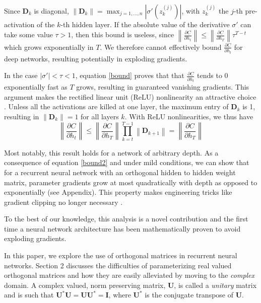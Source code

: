 \documentclass{article} %
\newcommand{\matr}[1]{\mathbf{#1}}
\newcommand\norm[1]{\left\lVert#1\right\rVert}
\begin{document}
Since $\matr{D}_k$ is diagonal, $\norm{\matr{D}_k} = \max_{j=1, ..., n} |\sigma'(z_k^{(j)})|$,
with $z_k^{(j)}$ the $j$-th pre-activation of the $k$-th hidden layer.
If the absolute value of the derivative $\sigma'$ can take some value $\tau > 1$, then 
this bound is useless, since $\norm{\frac{\partial C}{\partial h_t}} 
\leq \norm{\frac{\partial C}{\partial h_T}} \tau^{T-t}$ which grows exponentially 
in $T$. We therefore cannot effectively bound $\frac{\partial C}{\partial h_t}$ 
for deep networks, resulting potentially in exploding gradients.

In the case $|\sigma'| < \tau < 1$, equation \ref{bound} proves that 
that $\frac{\partial C}{\partial h_t}$ tends to 0 exponentially fast as $T$ grows, 
resulting in guaranteed vanishing gradients. 
This argument makes the rectified linear unit (ReLU) nonlinearity an attractive choice
\citep{Glorot2011, Nair2010}. Unless all the activations are killed at one layer, 
the maximum entry of $\matr{D}_k$ is 1, resulting in
$\norm{\matr{D}_k} = 1$ for all layers $k$. With ReLU nonlinearities, we thus have
\begin{equation}
  \norm{\frac{\partial C}{\partial h_t}} \leq \norm{ \frac{\partial C}{\partial h_T}} 
  \prod_{k=t}^{T-1} \norm{\matr{D}_{k+1}} = \norm{\frac{\partial C}{\partial h_T}}
\label{bound2}
\end{equation}

Most notably, this result holds for a network of arbitrary depth. 
As a consequence of equation \ref{bound2} and under mild conditions, we can show that
for a recurrent neural network with an orthogonal hidden to hidden weight matrix, 
parameter gradients grow at most quadratically with depth as opposed to exponentially
{\color{red}(see Appendix)}. This property makes engineering tricks like gradient clipping no longer
necessary \citep{Pascanu2013}.

To the best of our knowledge, this analysis is a novel contribution and the first time a 
neural network architecture has been mathematically proven to avoid exploding gradients. 

In this paper, we explore the use of orthogonal matrices in recurrent neural networks. 
Section 2 discusses the difficulties of parameterizing real valued orthogonal matrices and how
they are easily alleviated by moving to the \textit{complex} domain. 
A complex valued, norm preserving matrix,
$\matr{U}$, is called a \textit{unitary} matrix and is such that 
$\matr{U}^* \matr{U} = \matr{U} \matr{U}^* = \matr{I}$, where $\matr{U}^*$ is the conjugate transpose
of $\matr{U}$.   
\end{document}
